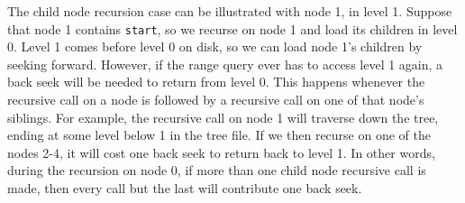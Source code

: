 \documentclass[11pt, oneside]{article}
\newcommand{\ms}{\texttt}
\begin{document}
The child node recursion case can be illustrated with node 1, in level 1.
Suppose that node 1 contains \ms{start}, so we recurse on node 1 and load its
children in level 0. Level 1 comes before level 0 on disk, so we can load node
1's children by seeking forward. However, if the range query ever has to access
level 1 again, a back seek will be needed to return from level 0. This happens
whenever the recursive call on a node is followed by a recursive call on one of
that node's siblings. For example, the recursive call on node 1 will traverse
down the tree, ending at some level below 1 in the tree file. If we then recurse
on one of the nodes 2-4, it will cost one back seek to return back to level 1.
In other words, during the recursion on node 0, if more than one child node
recursive call is made, then every call but the last will contribute one
back seek. \\
\end{document}
